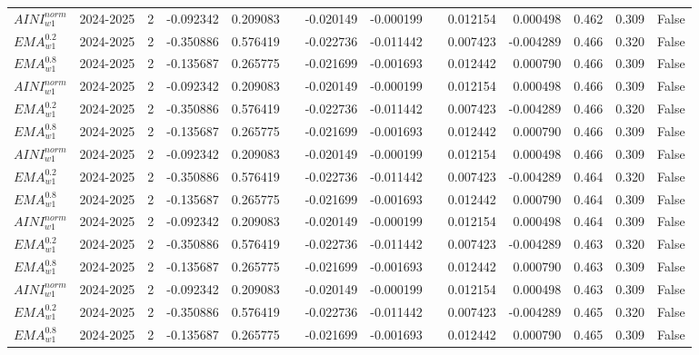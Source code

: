 \begin{tabular}{@{}llrrrrrrrrrlll@{}}
$AINI^{norm}_{w1}$ & 2024-2025 & 2 & -0.092342 & 0.209083 &  & -0.020149 & -0.000199 &  & 0.012154 & 0.000498 & 0.462 & 0.309 & False \\
$EMA^{0.2}_{w1}$ & 2024-2025 & 2 & -0.350886 & 0.576419 &  & -0.022736 & -0.011442 &  & 0.007423 & -0.004289 & 0.466 & 0.320 & False \\
$EMA^{0.8}_{w1}$ & 2024-2025 & 2 & -0.135687 & 0.265775 &  & -0.021699 & -0.001693 &  & 0.012442 & 0.000790 & 0.466 & 0.309 & False \\
$AINI^{norm}_{w1}$ & 2024-2025 & 2 & -0.092342 & 0.209083 &  & -0.020149 & -0.000199 &  & 0.012154 & 0.000498 & 0.466 & 0.309 & False \\
$EMA^{0.2}_{w1}$ & 2024-2025 & 2 & -0.350886 & 0.576419 &  & -0.022736 & -0.011442 &  & 0.007423 & -0.004289 & 0.466 & 0.320 & False \\
$EMA^{0.8}_{w1}$ & 2024-2025 & 2 & -0.135687 & 0.265775 &  & -0.021699 & -0.001693 &  & 0.012442 & 0.000790 & 0.466 & 0.309 & False \\
$AINI^{norm}_{w1}$ & 2024-2025 & 2 & -0.092342 & 0.209083 &  & -0.020149 & -0.000199 &  & 0.012154 & 0.000498 & 0.466 & 0.309 & False \\
$EMA^{0.2}_{w1}$ & 2024-2025 & 2 & -0.350886 & 0.576419 &  & -0.022736 & -0.011442 &  & 0.007423 & -0.004289 & 0.464 & 0.320 & False \\
$EMA^{0.8}_{w1}$ & 2024-2025 & 2 & -0.135687 & 0.265775 &  & -0.021699 & -0.001693 &  & 0.012442 & 0.000790 & 0.464 & 0.309 & False \\
$AINI^{norm}_{w1}$ & 2024-2025 & 2 & -0.092342 & 0.209083 &  & -0.020149 & -0.000199 &  & 0.012154 & 0.000498 & 0.464 & 0.309 & False \\
$EMA^{0.2}_{w1}$ & 2024-2025 & 2 & -0.350886 & 0.576419 &  & -0.022736 & -0.011442 &  & 0.007423 & -0.004289 & 0.463 & 0.320 & False \\
$EMA^{0.8}_{w1}$ & 2024-2025 & 2 & -0.135687 & 0.265775 &  & -0.021699 & -0.001693 &  & 0.012442 & 0.000790 & 0.463 & 0.309 & False \\
$AINI^{norm}_{w1}$ & 2024-2025 & 2 & -0.092342 & 0.209083 &  & -0.020149 & -0.000199 &  & 0.012154 & 0.000498 & 0.463 & 0.309 & False \\
$EMA^{0.2}_{w1}$ & 2024-2025 & 2 & -0.350886 & 0.576419 &  & -0.022736 & -0.011442 &  & 0.007423 & -0.004289 & 0.465 & 0.320 & False \\
$EMA^{0.8}_{w1}$ & 2024-2025 & 2 & -0.135687 & 0.265775 &  & -0.021699 & -0.001693 &  & 0.012442 & 0.000790 & 0.465 & 0.309 & False \\

\end{tabular}
